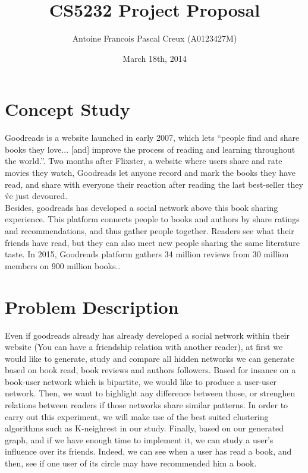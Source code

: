 \documentclass[11pt]{article}
\title{\textbf{CS5232 Project Proposal\\} }
\author{Antoine Francois Pascal Creux (A0123427M)}
\date{March 18th, 2014}
\begin{document}
    \maketitle


\section{Concept Study}


Goodreads is a website launched in early 2007, which lets ``people find and share books they love... [and] improve the process of reading and learning throughout the world.''\cite{goodreads:aboutus}. Two months after Flixster\cite{flixter}, a website where users share and rate movies they watch, Goodreads let anyone record and mark the books they have read, and share with everyone their reaction after reading the last best-seller they \'ve just devoured.\\
Besides, goodreads has developed a social network above this book sharing experience. This platform connects people to books and authors by share ratings and recommendations, and thus gather people together. Readers see what their friends have read, but they can also meet new people sharing the same literature taste. In 2015, Goodreads platform gathers 34 million reviews from 30 million members on 900 million books.\cite{https://www.goodreads.com/about/us}.



\section{Problem Description}


Even if goodreads already has already developed a social network within their website (You can have a friendship relation with another reader), at first we would like to generate, study and compare all hidden networks we can generate based on book read, book reviews and authors followers. Based for insance on a book-user network which is bipartite, we would like to produce a user-user network. Then, we want to highlight any difference between those, or strenghen relations between readers if those networks share similar patterns. In order to carry out this experiment, we will make use of the best suited clustering algorithms such as K-neighrest in our study.
Finally, based on our generated graph, and if we have enough time to implement it, we can study a user's influence over its friends. Indeed, we can see when a user has read a book, and then, see if one user of its circle may have recommended him a book.
\end{document}
